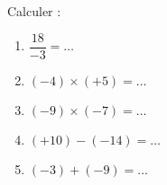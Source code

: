 
\begin{exercice}\label{exosmath-0826}

    Calculer :
    \begin{enumerate}
        \item
            \( \dfrac{ 18 }{ -3 }=\ldots\)
        \item
            \( (-4)\times (+5)=\ldots\)
        \item
            \( (-9)\times (-7)=\ldots\)
        \item
            \( (+10)-(-14)=\ldots\)
        \item
            \( (-3)+(-9)=\ldots\)
    \end{enumerate}


\end{exercice}
